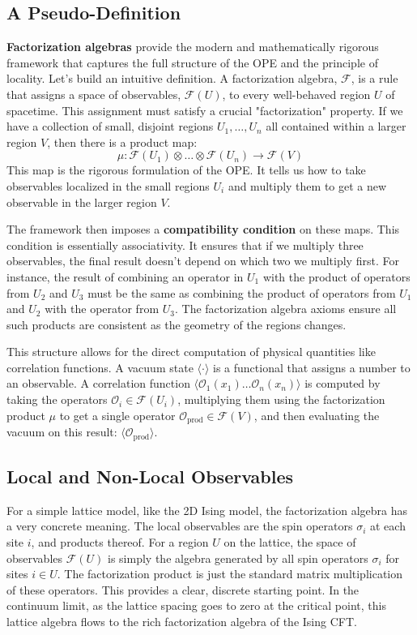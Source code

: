 \subsection*{A Pseudo-Definition}
\textbf{Factorization algebras} provide the modern and mathematically rigorous framework that captures the full structure of the OPE and the principle of locality. Let's build an intuitive definition. A factorization algebra, $\mathcal{F}$, is a rule that assigns a space of observables, $\mathcal{F}(U)$, to every well-behaved region $U$ of spacetime. This assignment must satisfy a crucial "factorization" property. If we have a collection of small, disjoint regions $U_1, \dots, U_n$ all contained within a larger region $V$, then there is a product map:
\begin{equation}
    \mu: \mathcal{F}(U_1) \otimes \dots \otimes \mathcal{F}(U_n) \to \mathcal{F}(V)
\end{equation}
This map is the rigorous formulation of the OPE. It tells us how to take observables localized in the small regions $U_i$ and multiply them to get a new observable in the larger region $V$.

The framework then imposes a \textbf{compatibility condition} on these maps. This condition is essentially associativity. It ensures that if we multiply three observables, the final result doesn't depend on which two we multiply first. For instance, the result of combining an operator in $U_1$ with the product of operators from $U_2$ and $U_3$ must be the same as combining the product of operators from $U_1$ and $U_2$ with the operator from $U_3$. The factorization algebra axioms ensure all such products are consistent as the geometry of the regions changes.

This structure allows for the direct computation of physical quantities like correlation functions. A vacuum state $\langle \cdot \rangle$ is a functional that assigns a number to an observable. A correlation function $\langle \mathcal{O}_1(x_1) \dots \mathcal{O}_n(x_n) \rangle$ is computed by taking the operators $\mathcal{O}_i \in \mathcal{F}(U_i)$, multiplying them using the factorization product $\mu$ to get a single operator $\mathcal{O}_{\text{prod}} \in \mathcal{F}(V)$, and then evaluating the vacuum on this result: $\langle \mathcal{O}_{\text{prod}} \rangle$.

\subsection*{Local and Non-Local Observables}
For a simple lattice model, like the 2D Ising model, the factorization algebra has a very concrete meaning. The local observables are the spin operators $\sigma_i$ at each site $i$, and products thereof. For a region $U$ on the lattice, the space of observables $\mathcal{F}(U)$ is simply the algebra generated by all spin operators $\sigma_i$ for sites $i \in U$. The factorization product is just the standard matrix multiplication of these operators. This provides a clear, discrete starting point. In the continuum limit, as the lattice spacing goes to zero at the critical point, this lattice algebra flows to the rich factorization algebra of the Ising CFT.

